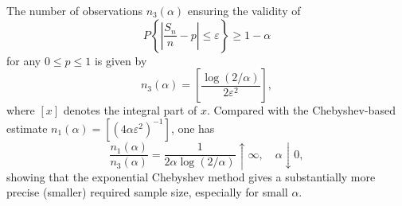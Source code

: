 The number of observations $n_3(\alpha)$ ensuring the validity of
$$
P\left\{\left|\frac{S_n}{n} - p\right| \leq \varepsilon\right\} \geq 1 - \alpha
$$
for any $0 \leq p \leq 1$ is given by
$$
n_3(\alpha) = \left[ \frac{\log(2/\alpha)}{2\varepsilon^2} \right],
$$
where $[x]$ denotes the integral part of $x$. Compared with the Chebyshev-based estimate $n_1(\alpha) = [(4\alpha\varepsilon^2)^{-1}]$, one has
$$
\frac{n_1(\alpha)}{n_3(\alpha)} = \frac{1}{2\alpha \log(2/\alpha)} \uparrow \infty, \quad \alpha \downarrow 0,
$$
showing that the exponential Chebyshev method gives a substantially more precise (smaller) required sample size, especially for small $\alpha$.
